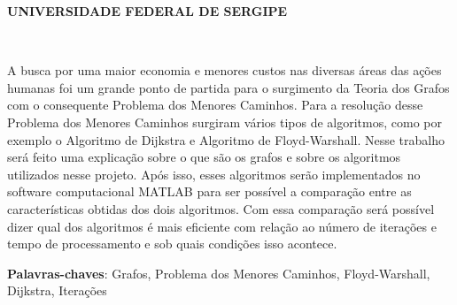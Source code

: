 \documentclass[
12pt,				%
openright,			%
oneside,			%
a4paper,			%
english,			%
french,				%
spanish,			%
brazil,				%
]{abntex2}
\renewcommand{\imprimircapa}{%
	\begin{capa}%
		\center
		\ABNTEXchapterfont\Large \textbf{UNIVERSIDADE FEDERAL DE SERGIPE}
		\\
		\vspace*{1cm}
		{\ABNTEXchapterfont\large\imprimirautor}
		\vfill
		\begin{center}
			\ABNTEXchapterfont\bfseries\LARGE\imprimirtitulo
		\end{center}
		\vfill
		\large\imprimirlocal \\
		\large\imprimirdata
		\vspace*{1cm}
	\end{capa}
}
\begin{document}
	
	
	\frenchspacing 
	
	
	\imprimircapa
	
	\imprimirfolhaderosto*
	
	
	
	\setlength{\absparsep}{18pt} %
	\begin{resumo}
		A busca por uma maior economia e menores custos nas diversas áreas das ações humanas foi um grande ponto de partida para o surgimento da Teoria dos Grafos com o consequente Problema dos Menores Caminhos. Para a resolução desse Problema dos Menores Caminhos surgiram vários tipos de algoritmos, como por exemplo o Algoritmo de Dijkstra e Algoritmo de Floyd-Warshall. Nesse trabalho será feito uma explicação sobre o que são os grafos e sobre os algoritmos utilizados nesse projeto. Após isso, esses algoritmos serão implementados no software computacional MATLAB para ser possível a comparação entre as características obtidas dos dois algoritmos. Com essa comparação será possível dizer qual dos algoritmos é mais eficiente com relação ao número de iterações e tempo de processamento e sob quais condições isso acontece.
		
		\noindent
		\textbf{Palavras-chaves}: Grafos, Problema dos Menores Caminhos, Floyd-Warshall, Dijkstra, Iterações
	\end{resumo}
	
	\listoffigures*
	\pagebreak
	
	\listoftables*
	\pagebreak
	
	
	
	\tableofcontents*
	\pagebreak
	
	
	
\end{document}
